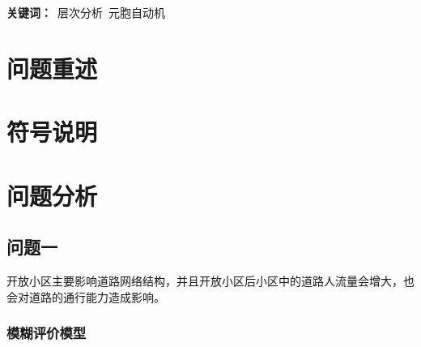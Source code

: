\documentclass[fontset=windows,a4paper,12pt]{ctexart}
\begin{document}
  \begin{center}
  \end{center}
  \linespread{1.2}
  \begin{center}
  \end{center}
  \textbf{关键词：}\ 层次分析\ 元胞自动机
  
  \section{问题重述}
  \section{符号说明}
  \section{问题分析}
	\subsection{问题一}
		开放小区主要影响道路网络结构，并且开放小区后小区中的道路人流量会增大，也会对道路的通行能力造成影响。

		\subsubsection{模糊评价模型}
			
\end{document}
